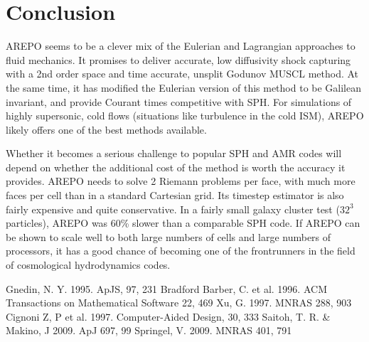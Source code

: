 \documentclass[12pt, preprint]{aastex}
\begin{document}
\section{Conclusion}
AREPO seems to be a clever mix of the Eulerian and Lagrangian approaches to
fluid mechanics.  It promises to deliver accurate, low diffusivity shock
capturing with a 2nd order space and time accurate, unsplit Godunov MUSCL
method.  At the same time, it has modified the Eulerian version of this method
to be Galilean invariant, and provide Courant times competitive with SPH.  For
simulations of highly supersonic, cold flows (situations like turbulence in the
cold ISM), AREPO likely offers one of the best methods available.

Whether it becomes a serious challenge to popular SPH and AMR codes will depend
on whether the additional cost of the method is worth the accuracy it provides.
AREPO needs to solve 2 Riemann problems per face, with much more faces per cell
than in a standard Cartesian grid.  Its timestep estimator is also fairly
expensive and quite conservative.  In a fairly small galaxy cluster test ($32^3$
particles), AREPO was 60\% slower than a comparable SPH code.  If AREPO can be
shown to scale well to both large numbers of cells and large numbers of
processors, it has a good chance of becoming one of the frontrunners in the
field of cosmological hydrodynamics codes.
\begin{thebibliography}{}
	 Gnedin, N. Y. 1995.
		ApJS, 97, 231
	 Bradford Barber, C. et
		al. 1996.
		ACM Transactions on Mathematical Software 22, 469
	 Xu, G. 1997.
		MNRAS 288, 903
	 Cignoni Z, P et al. 1997.
		Computer-Aided Design, 30, 333
	 Saitoh, T. R. \& Makino, J
		2009. ApJ 697, 99
	 Springel, V. 2009.
		MNRAS 401, 791
\end{thebibliography}
\end{document}
